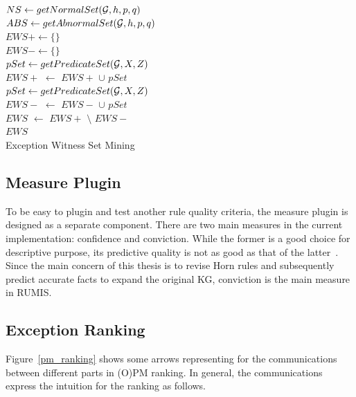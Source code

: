 \IncMargin{1.5em}
\begin{algorithm}[H]
\DontPrintSemicolon
\SetAlgoLined
{}
\BlankLine
$NS \leftarrow getNormalSet(\mathcal{G}, h, p, q)$\\
$ABS \leftarrow getAbnormalSet(\mathcal{G}, h, p, q)$\\
$EWS+ \leftarrow \{\}$\\
$EWS- \leftarrow \{\}$\\
\BlankLine
{} {
	$pSet \leftarrow getPredicateSet(\mathcal{G}, X, Z)$\\
	$EWS+$ $\leftarrow$ $EWS+$ $\cup$ $pSet$\\
}
 {
	$pSet \leftarrow getPredicateSet(\mathcal{G}, X, Z)$\\
	$EWS-$ $\leftarrow$ $EWS-$ $\cup$ $pSet$\\
}
$EWS$ $\leftarrow$ $EWS+$ $\setminus$ $EWS-$\\
\Return $EWS$\\
\caption{Exception Witness Set Mining}
\label{algo3}
\end{algorithm}
\DecMargin{1.5em}

\subsection{Measure Plugin}

To be easy to plugin and test another rule quality criteria, the measure plugin is designed as a separate component. There are two main measures in the current implementation: confidence and conviction. While the former is a good choice for descriptive purpose, its predictive quality is not as good as that of the latter~\cite{ref46}. Since the main concern of this thesis is to revise Horn rules and subsequently predict accurate facts to expand the original KG, conviction is the main measure in RUMIS.

\subsection{Exception Ranking}
\label{intuition_er}

Figure~\ref{pm_ranking} shows some arrows representing for the communications between different parts in (O)PM ranking. In general, the communications express the intuition for the ranking as follows.

